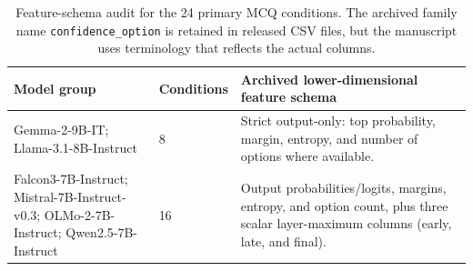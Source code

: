 \begin{table}[t]
\centering
\small
\caption{Feature-schema audit for the 24 primary MCQ conditions. The archived family name \texttt{confidence\_option} is retained in released CSV files, but the manuscript uses terminology that reflects the actual columns.}
\label{tab:feature-schema-audit}
\begin{tabularx}{\textwidth}{p{}p{}X}
\toprule
Model group & Conditions & Archived lower-dimensional feature schema \\
\midrule
Gemma-2-9B-IT; Llama-3.1-8B-Instruct & 8 & Strict output-only: top probability, margin, entropy, and number of options where available. \\
Falcon3-7B-Instruct; Mistral-7B-Instruct-v0.3; OLMo-2-7B-Instruct; Qwen2.5-7B-Instruct & 16 & Output probabilities/logits, margins, entropy, and option count, plus three scalar layer-maximum columns (early, late, and final). \\
\bottomrule
\end{tabularx}
\end{table}
